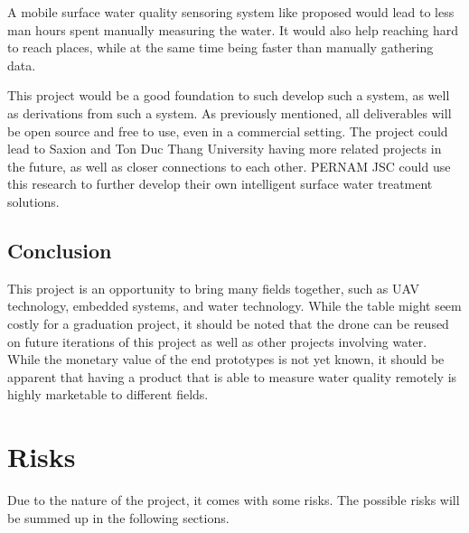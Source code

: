 \documentclass[11pt, a4paper]{article}
\begin{document}
A mobile surface water quality sensoring system like proposed would lead to less man hours spent manually measuring the water. It would also help reaching hard to reach places, while at the same time being faster than manually gathering data.

This project would be a good foundation to such develop such a system, as well as derivations from such a system. As previously mentioned, all deliverables will be open source and free to use, even in a commercial setting. The project could lead to Saxion and Ton Duc Thang University having more related projects in the future, as well as closer connections to each other. PERNAM JSC could use this research to further develop their own intelligent surface water treatment solutions.

\subsection{Conclusion}
This project is an opportunity to bring many fields together, such as UAV technology, embedded systems, and water technology. While the table might seem costly for a graduation project, it should be noted that the drone can be reused on future iterations of this project as well as other projects involving water. While the monetary value of the end prototypes is not yet known, it should be apparent that having a product that is able to measure water quality remotely is highly marketable to different fields.

\section{Risks}
Due to the nature of the project, it comes with some risks. The possible risks will be summed up in the following sections.
\end{document}
